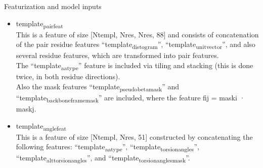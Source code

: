 \documentclass[presentation, smaller]{beamer}
\begin{document}
\begin{frame}[label={sec:orgd5be931}]{Featurization and model inputs \cite{jumperHighlyAccurateProtein2021}}
\begin{itemize}
\item \alert{template\textsubscript{pair}\textsubscript{feat}} \\
This is a feature of size [Ntempl, Nres, Nres, 88] and consists of concatenation of the pair residue features “template\textsubscript{distogram}”, “template\textsubscript{unit}\textsubscript{vector}”, and also several residue features, which are transformed into pair features. \\
The “template\textsubscript{aatype}” feature is included via tiling and stacking (this is done twice, in both residue directions). \\
Also the mask features “template\textsubscript{pseudo}\textsubscript{beta}\textsubscript{mask}” and “template\textsubscript{backbone}\textsubscript{frame}\textsubscript{mask}” are included, where the feature fij = maski · maskj. \\
\item \alert{template\textsubscript{angle}\textsubscript{feat}} \\
This is a feature of size [Ntempl, Nres, 51] constructed by concatenating the following features: “template\textsubscript{aatype}”, “template\textsubscript{torsion}\textsubscript{angles}”, “template\textsubscript{alt}\textsubscript{torsion}\textsubscript{angles}”, and “template\textsubscript{torsion}\textsubscript{angles}\textsubscript{mask}”.
\end{itemize}
\end{frame}
\end{document}
